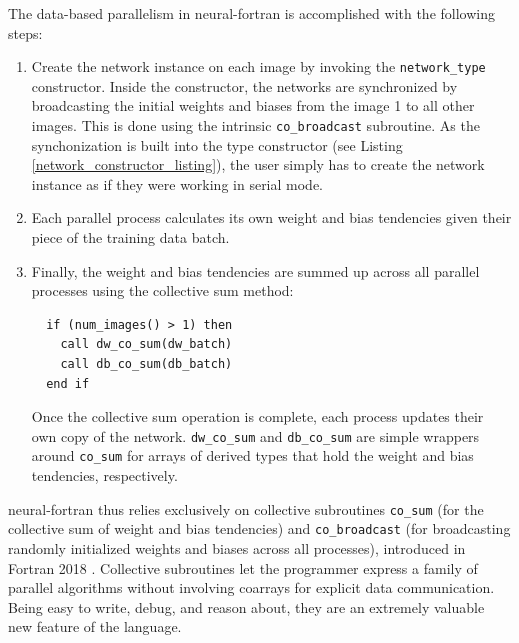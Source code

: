 \documentclass[sigplan, review=false, screen=true, balance=true]{acmart}
\begin{document}
The data-based parallelism in neural-fortran is accomplished with the
following steps:

\begin{enumerate}

  \item Create the network instance on each image by invoking the
  \lstinline{network_type} constructor. Inside the constructor, the networks
  are synchronized by broadcasting the initial weights and biases from the
  image 1 to all other images. This is done using the intrinsic
  \lstinline{co_broadcast} subroutine. As the synchonization is built into the
  type constructor (see Listing \ref{network_constructor_listing}), the user
  simply has to create the network instance as if they were working in serial mode.

  \item Each parallel process calculates its own weight and bias tendencies given
  their piece of the training data batch.

  \item Finally, the weight and bias tendencies are summed up across all parallel
  processes using the collective sum method:

  \begin{lstlisting}
  if (num_images() > 1) then
    call dw_co_sum(dw_batch)
    call db_co_sum(db_batch)
  end if
  \end{lstlisting}

  Once the collective sum operation is complete, each process updates their
  own copy of the network. \lstinline{dw_co_sum} and \lstinline{db_co_sum} are
  simple wrappers around \lstinline{co_sum} for arrays of derived types that
  hold the weight and bias tendencies, respectively.

\end{enumerate}

neural-fortran thus relies exclusively on collective subroutines
\lstinline{co_sum} (for the collective sum of weight and bias tendencies) and
\lstinline{co_broadcast} (for broadcasting randomly initialized weights and biases
across all processes), introduced in Fortran 2018 \citep{reid18}.
Collective subroutines let the programmer express a family of parallel
algorithms without involving coarrays for explicit data communication.
Being easy to write, debug, and reason about, they are an extremely valuable
new feature of the language.
\end{document}
